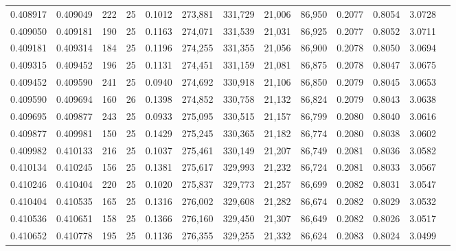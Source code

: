 \begin{tabular}{rrrrrrrrrrrrr}
0.408917 & 0.409049 &   222 &  25 &                                     0.1012 & 273,881 & 331,729 &  21,006 &  86,950 & 0.2077 & 0.8054 & 3.0728 \\
0.409050 & 0.409181 &   190 &  25 &                                     0.1163 & 274,071 & 331,539 &  21,031 &  86,925 & 0.2077 & 0.8052 & 3.0711 \\
0.409181 & 0.409314 &   184 &  25 &                                     0.1196 & 274,255 & 331,355 &  21,056 &  86,900 & 0.2078 & 0.8050 & 3.0694 \\
0.409315 & 0.409452 &   196 &  25 &                                     0.1131 & 274,451 & 331,159 &  21,081 &  86,875 & 0.2078 & 0.8047 & 3.0675 \\
0.409452 & 0.409590 &   241 &  25 &                                     0.0940 & 274,692 & 330,918 &  21,106 &  86,850 & 0.2079 & 0.8045 & 3.0653 \\
0.409590 & 0.409694 &   160 &  26 &                                     0.1398 & 274,852 & 330,758 &  21,132 &  86,824 & 0.2079 & 0.8043 & 3.0638 \\
0.409695 & 0.409877 &   243 &  25 &                                     0.0933 & 275,095 & 330,515 &  21,157 &  86,799 & 0.2080 & 0.8040 & 3.0616 \\
0.409877 & 0.409981 &   150 &  25 &                                     0.1429 & 275,245 & 330,365 &  21,182 &  86,774 & 0.2080 & 0.8038 & 3.0602 \\
0.409982 & 0.410133 &   216 &  25 &                                     0.1037 & 275,461 & 330,149 &  21,207 &  86,749 & 0.2081 & 0.8036 & 3.0582 \\
0.410134 & 0.410245 &   156 &  25 &                                     0.1381 & 275,617 & 329,993 &  21,232 &  86,724 & 0.2081 & 0.8033 & 3.0567 \\
0.410246 & 0.410404 &   220 &  25 &                                     0.1020 & 275,837 & 329,773 &  21,257 &  86,699 & 0.2082 & 0.8031 & 3.0547 \\
0.410404 & 0.410535 &   165 &  25 &                                     0.1316 & 276,002 & 329,608 &  21,282 &  86,674 & 0.2082 & 0.8029 & 3.0532 \\
0.410536 & 0.410651 &   158 &  25 &                                     0.1366 & 276,160 & 329,450 &  21,307 &  86,649 & 0.2082 & 0.8026 & 3.0517 \\
0.410652 & 0.410778 &   195 &  25 &                                     0.1136 & 276,355 & 329,255 &  21,332 &  86,624 & 0.2083 & 0.8024 & 3.0499 \\

\end{tabular}
